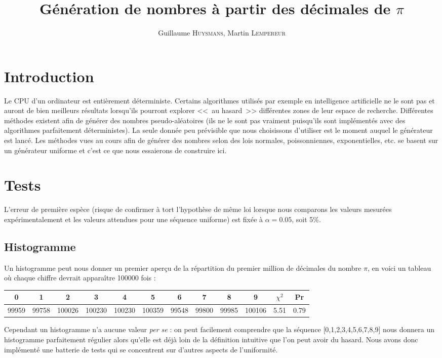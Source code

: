 \documentclass[12pt,a4paper]{article}
\author{Guillaume \textsc{Huysmans}, Martin \textsc{Lempereur}}
\title{Génération de nombres à partir des décimales de $\pi$}
\begin{document}
\maketitle

\section{Introduction}
Le CPU d'un ordinateur est entièrement déterministe. Certains algorithmes
utilisés par exemple en intelligence artificielle ne le sont pas et auront de
bien meilleurs résultats lorsqu'ils pourront explorer <<~au hasard~>> différentes
zones de leur espace de recherche. Différentes méthodes existent afin de générer
des nombres pseudo-aléatoires (ils ne le sont pas vraiment puisqu'ils sont
implémentés avec des algorithmes parfaitement déterministes). La seule donnée
peu prévisible que nous choisissons d'utiliser est le moment auquel le générateur
est lancé.
Les méthodes vues au cours afin de générer des nombres selon des lois normales,
poissonniennes, exponentielles, etc. se basent sur un générateur uniforme et
c'est ce que nous essaierons de construire ici. 

\section{Tests}
L'erreur de première espèce (risque de confirmer à tort l'hypothèse de même loi
lorsque nous comparons les valeurs mesurées expérimentalement et les valeurs
attendues pour une séquence uniforme)
est fixée à $\alpha=0.05$, soit 5\%.

\subsection{Histogramme}
Un histogramme peut nous donner un premier aperçu de la répartition
du premier million de décimales du nombre $\pi$, en voici un tableau
où chaque chiffre devrait apparaître 100000 fois :

\begin{center}
\begin{tabular}{c|c|c|c|c|c|c|c|c|c|c|c}
0 & 1 & 2 & 3 & 4 & 5 & 6 & 7 & 8 & 9 & $\chi^2$ & Pr \\ \hline
99959 & 99758 & 100026 & 100230 & 100230 &
100359 & 99548 & 99800 & 99985 & 100106 &
5.51 & 0.79
\end{tabular}
\end{center}

Cependant un histogramme n'a aucune valeur \textit{per se} :
on peut facilement comprendre que la séquence [0,1,2,3,4,5,6,7,8,9]
nous donnera un histogramme parfaitement régulier alors qu'elle est déjà loin
de la définition intuitive que l'on peut avoir du hasard.
Nous avons donc implémenté une batterie de tests qui se concentrent
sur d'autres aspects de l'uniformité.
\end{document}
